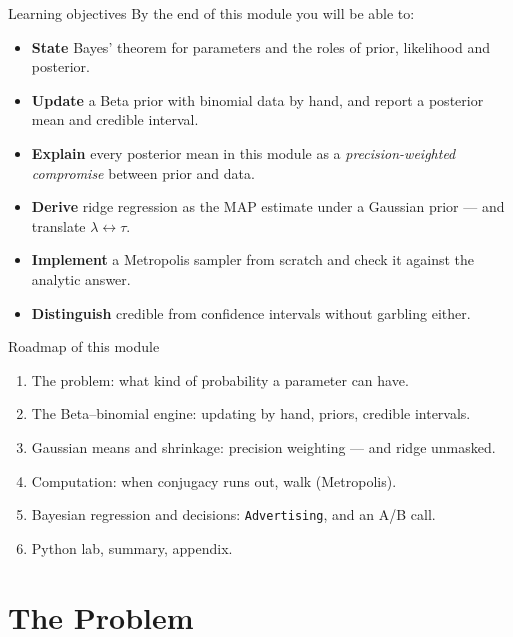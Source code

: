 \documentclass[aspectratio=169,11pt]{beamer}
\begin{document}
\begin{frame}{Learning objectives}
  By the end of this module you will be able to:
  \begin{itemize}
    \item \textbf{State} Bayes' theorem for parameters and the roles of prior,
          likelihood and posterior.
    \item \textbf{Update} a Beta prior with binomial data by hand, and report a
          posterior mean and credible interval.
    \item \textbf{Explain} every posterior mean in this module as a
          \emph{precision-weighted compromise} between prior and data.
    \item \textbf{Derive} ridge regression as the MAP estimate under a Gaussian
          prior --- and translate $\lambda \leftrightarrow \tau$.
    \item \textbf{Implement} a Metropolis sampler from scratch and check it against
          the analytic answer.
    \item \textbf{Distinguish} credible from confidence intervals without garbling
          either.
  \end{itemize}
\end{frame}

\begin{frame}{Roadmap of this module}
  \begin{takeaway}
    \begin{enumerate}
      \item The problem: what kind of probability a parameter can have.
      \item The Beta--binomial engine: updating by hand, priors, credible
            intervals.
      \item Gaussian means and shrinkage: precision weighting --- and ridge
            unmasked.
      \item Computation: when conjugacy runs out, walk (Metropolis).
      \item Bayesian regression and decisions: \texttt{Advertising}, and an A/B
            call.
      \item Python lab, summary, appendix.
    \end{enumerate}
  \end{takeaway}
\end{frame}

\section{The Problem}
\end{document}
